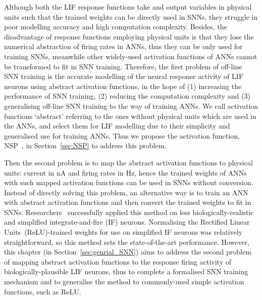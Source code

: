 	
	Although both the LIF response functions take and output variables in physical units such that the trained weights can be directly used in SNNs, they struggle in poor modelling accuracy and high computation complexity.
	Besides, the disadvantage of response functions employing physical units is that they lose the numerical abstraction of firing rates in ANNs, thus they can be only used for training SNNs, meanwhile other widely-used activation functions of ANNs cannot be transformed to fit in SNN training. 
	Therefore, the first problem of off-line SNN training is the accurate modelling of the neural response activity of LIF neurons using abstract activation functions, in the hope of (1) increasing the performance of SNN training, (2) reducing the computation complexity and (3) generalising off-line SNN training to the way of training ANNs.
	We call activation functions `abstract' referring to the ones without physical units which are used in the ANNs, and select them for LIF modelling due to their simplicity and generalised use for training ANNs.
	Thus we propose the activation function, NSP~\citep{liu2016noisy}, in Section~\ref{sec:NSP} to address this problem.
	
	
	
	Then the second problem is to map the abstract activation functions to physical units: current in nA and firing rates in Hz, hence the trained weights of ANNs with such mapped activation functions can be used in SNNs without conversion.
	Instead of directly solving this problem, an alternative way is to train an ANN with abstract activation functions and then convert the trained weights to fit in SNNs.
	Researchers~\citep{cao2015spiking,diehl2015fast} successfully applied this method on less biologically-realistic and simplified integrate-and-fire (IF) neurons.
	Normalising the Rectified Linear Units~(ReLU)-trained weights for use on simplified IF neurons was relatively straightforward, so this method sets the state-of-the-art performance.
	However, this chapter (in Section~\ref{sec:genrial_SNN}) aims to address the second problem of mapping abstract activation functions to the response firing activity of biologically-plausible LIF neurons, thus to complete a formalised SNN training mechanism and to generalise the method to commonly-used simple activation functions, such as ReLU.
